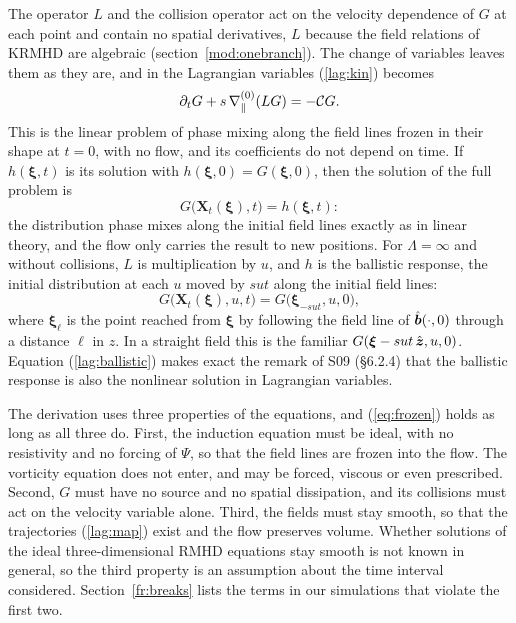The operator $L$ and the collision operator act on the velocity dependence of $G$ at each point and contain no spatial derivatives, $L$ because the field relations of KRMHD are algebraic (section~\ref{mod:onebranch}). The change of variables leaves them as they are, and in the Lagrangian variables (\ref{lag:kin}) becomes
\begin{equation}\label{lag:linear}
  \partial_tG+s\,\nabla_\parallel^{(0)}(LG)=-\mathcal CG .
\end{equation}
This is the linear problem of phase mixing along the field lines frozen in their shape at $t=0$, with no flow, and its coefficients do not depend on time. If $h(\boldsymbol\xi,t)$ is its solution with $h(\boldsymbol\xi,0)=G(\boldsymbol\xi,0)$, then the solution of the full problem is
\begin{equation}\label{eq:frozen}
  G\big(\boldsymbol X_t(\boldsymbol\xi),t\big)=h(\boldsymbol\xi,t) :
\end{equation}
the distribution phase mixes along the initial field lines exactly as in linear theory, and the flow only carries the result to new positions. For $\Lambda=\infty$ and without collisions, $L$ is multiplication by $u$, and $h$ is the ballistic response, the initial distribution at each $u$ moved by $sut$ along the initial field lines:
\begin{equation}\label{lag:ballistic}
  G\big(\boldsymbol X_t(\boldsymbol\xi),u,t\big)=G\big(\boldsymbol\xi_{-sut},u,0\big),
\end{equation}
where $\boldsymbol\xi_\ell$ is the point reached from $\boldsymbol\xi$ by following the field line of $\hat{\boldsymbol b}(\cdot,0)$ through a distance $\ell$ in $z$. In a straight field this is the familiar $G(\boldsymbol\xi-sut\,\hat{\boldsymbol z},u,0)$. Equation (\ref{lag:ballistic}) makes exact the remark of S09 (\S6.2.4) that the ballistic response is also the nonlinear solution in Lagrangian variables.

The derivation uses three properties of the equations, and (\ref{eq:frozen}) holds as long as all three do. First, the induction equation must be ideal, with no resistivity and no forcing of $\Psi$, so that the field lines are frozen into the flow. The vorticity equation does not enter, and may be forced, viscous or even prescribed. Second, $G$ must have no source and no spatial dissipation, and its collisions must act on the velocity variable alone. Third, the fields must stay smooth, so that the trajectories (\ref{lag:map}) exist and the flow preserves volume. Whether solutions of the ideal three-dimensional RMHD equations stay smooth is not known in general, so the third property is an assumption about the time interval considered. Section~\ref{fr:breaks} lists the terms in our simulations that violate the first two.


